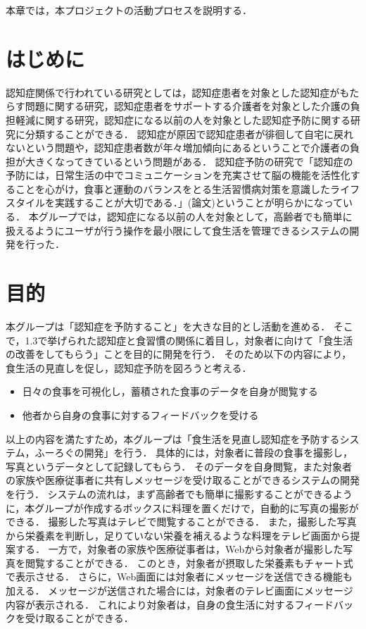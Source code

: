 \documentclass[../report]{subfiles}
\begin{document}
本章では，本プロジェクトの活動プロセスを説明する．

\section{はじめに}
認知症関係で行われている研究としては，認知症患者を対象とした認知症がもたらす問題に関する研究，認知症患者をサポートする介護者を対象とした介護の負担軽減に関する研究，認知症になる以前の人を対象とした認知症予防に関する研究に分類することができる．
認知症が原因で認知症患者が徘徊して自宅に戻れないという問題や，認知症患者数が年々増加傾向にあるということで介護者の負担が大きくなってきているという問題がある．
認知症予防の研究で「認知症の予防には，日常生活の中でコミュニケーションを充実させて脳の機能を活性化することを心がけ，食事と運動のバランスをとる生活習慣病対策を意識したライフスタイルを実践することが大切である．」(論文)ということが明らかになっている．
本グループでは，認知症になる以前の人を対象として，高齢者でも簡単に扱えるようにユーザが行う操作を最小限にして食生活を管理できるシステムの開発を行った．


\section{目的} \label{sec:objective}
本グループは「認知症を予防すること」を大きな目的とし活動を進める．
そこで，1.3で挙げられた認知症と食習慣の関係に着目し，対象者に向けて「食生活の改善をしてもらう」ことを目的に開発を行う．
そのため以下の内容により，食生活の見直しを促し，認知症予防を図ろうと考える．

\begin{itemize}
  \item 日々の食事を可視化し，蓄積された食事のデータを自身が閲覧する
  \item 他者から自身の食事に対するフィードバックを受ける
\end{itemize}

以上の内容を満たすため，本グループは「食生活を見直し認知症を予防するシステム，ふーろぐの開発」を行う．
具体的には，対象者に普段の食事を撮影し，写真というデータとして記録してもらう．
そのデータを自身閲覧，また対象者の家族や医療従事者に共有しメッセージを受け取ることができるシステムの開発を行う．
システムの流れは，まず高齢者でも簡単に撮影することができるように，本グループが作成するボックスに料理を置くだけで，自動的に写真の撮影ができる．
撮影した写真はテレビで閲覧することができる．
また，撮影した写真から栄養素を判断し，足りていない栄養を補えるような料理をテレビ画面から提案する．
一方で，対象者の家族や医療従事者は，Webから対象者が撮影した写真を閲覧することができる．
このとき，対象者が摂取した栄養素もチャート式で表示させる．
さらに，Web画面には対象者にメッセージを送信できる機能も加える．
メッセージが送信された場合には，対象者のテレビ画面にメッセージ内容が表示される．
これにより対象者は，自身の食生活に対するフィードバックを受け取ることができる．
\end{document}
